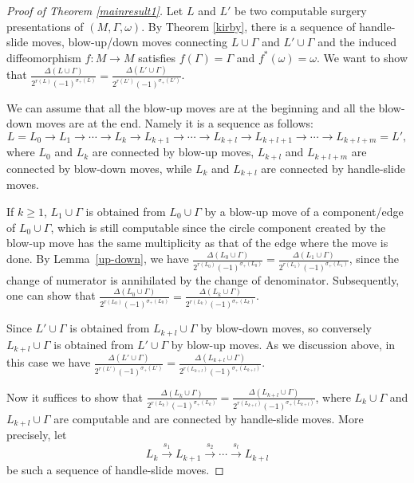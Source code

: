\documentclass[12pt]{amsart}
\begin{document}
\begin{proof}[Proof of Theorem \ref{mainresult1}]
Let $L$ and $L'$ be two computable surgery presentations of $(M, \Gamma, \omega)$. By Theorem \ref{kirby}, there is a sequence of handle-slide moves, blow-up/down moves connecting $L\cup \Gamma$ and $L'\cup \Gamma$ and the induced diffeomorphism $f: M\to M$ satisfies $f(\Gamma)=\Gamma$ and $f^{*}(\omega)=\omega$. We want to show that $\frac{\Delta (L\cup \Gamma)}{2^{r(L)}(-1)^{\sigma_+(L)}}=\frac{\Delta (L'\cup \Gamma)}{2^{r(L')}(-1)^{\sigma_+(L')}}$.

We can assume that all the blow-up moves are at the beginning and all the blow-down moves are at the end. Namely it is a sequence as follows:
$$L=L_0\to L_1\to \cdots \to L_k \to L_{k+1}\to \cdots \to L_{k+l}\to L_{k+l+1}\to \cdots \to L_{k+l+m}=L',$$
where $L_0$ and $L_{k}$ are connected by blow-up moves, $L_{k+l}$ and $L_{k+l+m}$ are connected by blow-down moves, while $L_{k}$ and $L_{k+l}$ are connected by handle-slide moves.

If $k\geq 1$, $L_1\cup \Gamma$ is obtained from $L_0\cup \Gamma$ by a blow-up move of a component/edge of $L_0\cup \Gamma$, which is still computable since the circle component created by the blow-up move has the same multiplicity as that of the edge where the move is done. By Lemma~\ref{up-down}, we have $\frac{\Delta (L_0\cup \Gamma)}{2^{r(L_0)}(-1)^{\sigma_+(L_0)}}=\frac{\Delta (L_1\cup \Gamma)}{2^{r(L_1)}(-1)^{\sigma_+(L_1)}}$, since the change of numerator is annihilated by the change of denominator. Subsequently, one can show that 
$\frac{\Delta (L_0\cup \Gamma)}{2^{r(L_0)}(-1)^{\sigma_+(L_0)}}=\frac{\Delta (L_k\cup \Gamma)}{2^{r(L_k)}(-1)^{\sigma_+(L_k)}}$.

Since $L'\cup \Gamma$ is obtained from $L_{k+l}\cup \Gamma$ by blow-down moves, so conversely $L_{k+l}\cup \Gamma$ is obtained from $L'\cup \Gamma$ by blow-up moves. As we discussion above, in this case we have $\frac{\Delta (L'\cup \Gamma)}{2^{r(L')}(-1)^{\sigma_+(L')}}=\frac{\Delta (L_{k+l}\cup \Gamma)}{2^{r(L_{k+l})}(-1)^{\sigma_+(L_{k+l})}}$.

Now it suffices to show that $\frac{\Delta (L_k\cup \Gamma)}{2^{r(L_k)}(-1)^{\sigma_+(L_k)}}=\frac{\Delta (L_{k+l}\cup \Gamma)}{2^{r(L_{k+l})}(-1)^{\sigma_+(L_{k+l})}}$, where $L_k\cup \Gamma$ and $L_{k+l}\cup \Gamma$ are computable and are connected by handle-slide moves. More precisely, let
\begin{equation*}
\label{sequence}
L_k \xrightarrow{s_1} L_{k+1}\xrightarrow{s_2} \cdots \xrightarrow{s_l} L_{k+l} \tag{H1}
\end{equation*}
be such a sequence of handle-slide moves.


\end{proof}
\end{document}
